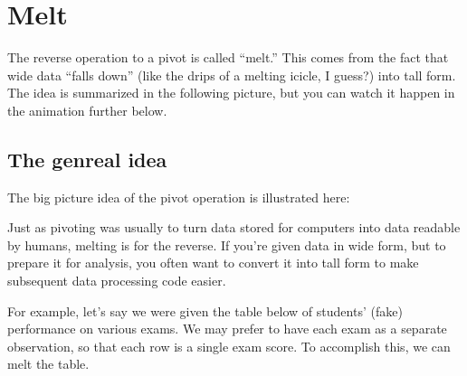 \documentclass[letterpaper,10pt,english]{jupyterBook}
\begin{document}
\section{Melt}
\label{\detokenize{chapter-6-single-table-verbs:melt}}
\sphinxAtStartPar
The reverse operation to a pivot is called “melt.”  This comes from the fact that wide data “falls down” (like the drips of a melting icicle, I guess?) into tall form.  The idea is summarized in the following picture, but you can watch it happen in the animation further below.


\subsection{The genreal idea}
\label{\detokenize{chapter-6-single-table-verbs:the-genreal-idea}}
\sphinxAtStartPar
The big picture idea of the pivot operation is illustrated here:

\sphinxAtStartPar
{}

\sphinxAtStartPar
Just as pivoting was usually to turn data stored for computers into data readable by humans, melting is for the reverse.  If you’re given data in wide form, but to prepare it for analysis, you often want to convert it into tall form to make subsequent data processing code easier.

\sphinxAtStartPar
For example, let’s say we were given the table below of students’ (fake) performance on various exams.  We may prefer to have each exam as a separate observation, so that each row is a single exam score.  To accomplish this, we can melt the table.
\end{document}
